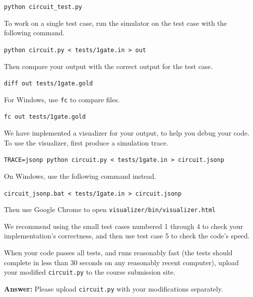 \documentclass[12pt,twoside]{article}
\newcommand{\answer}{
	\par\medskip
	\textbf{Answer:}
}
\begin{document}
\begin{problems}
\begin{problemparts}
		\texttt{python circuit\_test.py}

		To work on a single test case, run the simulator on the test case with the
		following command.

		\texttt{python circuit.py < tests/1gate.in > out}

		Then compare your output with the correct output for the test case.

		\texttt{diff out tests/1gate.gold}

		For Windows, use \texttt{fc} to compare files.

		\texttt{fc out tests/1gate.gold}

		We have implemented a visualizer for your output, to help you debug your code.
		To use the visualizer, first produce a simulation trace.

		\texttt{TRACE=jsonp python circuit.py < tests/1gate.in > circuit.jsonp}

		On Windows, use the following command instead.

		\texttt{circuit\_jsonp.bat < tests/1gate.in > circuit.jsonp}

		Then use Google Chrome to open
		\texttt{visualizer/bin/visualizer.html}

		We recommend using the small test cases numbered 1 through 4 to check your
		implementation's correctness, and then use test case 5 to check the code's
		speed.

		When your code passes all tests, and runs reasonably fast (the tests should
		complete in less than 30 seconds on any reasonably recent computer), upload your
		modified \texttt{circuit.py} to the course submission site.

		\answer {
			Please upload \texttt{circuit.py} with your modifications separately.
		}

	\end{problemparts}

\end{problems}
\end{document}
